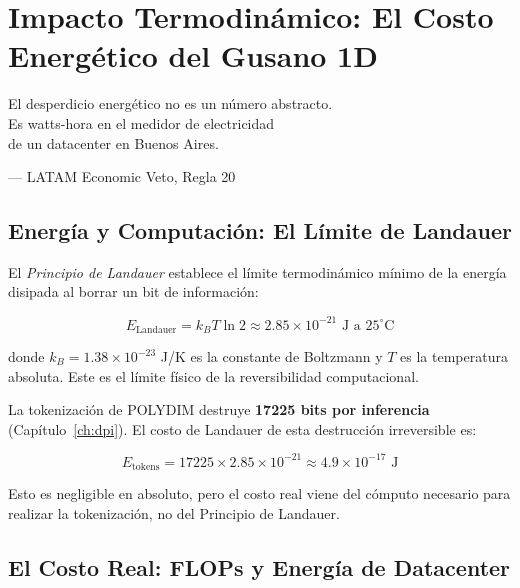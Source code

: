 \chapter{Impacto Termodinámico: El Costo Energético del Gusano 1D}
\label{ch:termodynamics}

\epigraph{El desperdicio energético no es un número abstracto.\\
Es watts-hora en el medidor de electricidad\\
de un datacenter en Buenos Aires.}{--- LATAM Economic Veto, Regla 20}

\section{Energía y Computación: El Límite de Landauer}

El \textit{Principio de Landauer} establece el límite termodinámico mínimo de la
energía disipada al borrar un bit de información:

\begin{equation}
E_{\text{Landauer}} = k_B T \ln 2 \approx 2.85 \times 10^{-21} \text{ J a } 25^\circ\text{C}
\label{eq:landauer}
\end{equation}

donde $k_B = 1.38 \times 10^{-23}$ J/K es la constante de Boltzmann y $T$ es la
temperatura absoluta. Este es el límite físico de la reversibilidad computacional.

La tokenización de POLYDIM destruye \textbf{17225 bits por inferencia} (Capítulo~\ref{ch:dpi}).
El costo de Landauer de esta destrucción irreversible es:

\begin{equation}
E_{\text{tokens}} = 17225 \times 2.85 \times 10^{-21} \approx 4.9 \times 10^{-17} \text{ J}
\end{equation}

Esto es negligible en absoluto, pero el costo real viene del cómputo necesario
para realizar la tokenización, no del Principio de Landauer.

\section{El Costo Real: FLOPs y Energía de Datacenter}

